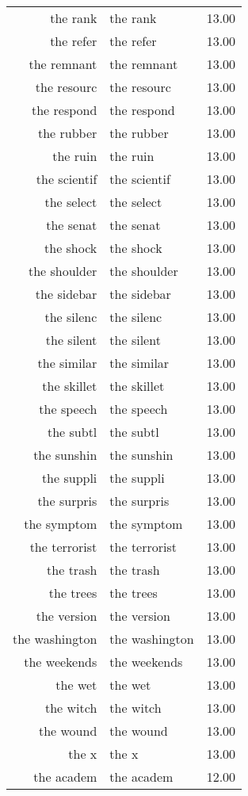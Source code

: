 \begin{table}[ht]
\begin{tabular}{rlr}
  the rank & the rank & 13.00 \\ 
  the refer & the refer & 13.00 \\ 
  the remnant & the remnant & 13.00 \\ 
  the resourc & the resourc & 13.00 \\ 
  the respond & the respond & 13.00 \\ 
  the rubber & the rubber & 13.00 \\ 
  the ruin & the ruin & 13.00 \\ 
  the scientif & the scientif & 13.00 \\ 
  the select & the select & 13.00 \\ 
  the senat & the senat & 13.00 \\ 
  the shock & the shock & 13.00 \\ 
  the shoulder & the shoulder & 13.00 \\ 
  the sidebar & the sidebar & 13.00 \\ 
  the silenc & the silenc & 13.00 \\ 
  the silent & the silent & 13.00 \\ 
  the similar & the similar & 13.00 \\ 
  the skillet & the skillet & 13.00 \\ 
  the speech & the speech & 13.00 \\ 
  the subtl & the subtl & 13.00 \\ 
  the sunshin & the sunshin & 13.00 \\ 
  the suppli & the suppli & 13.00 \\ 
  the surpris & the surpris & 13.00 \\ 
  the symptom & the symptom & 13.00 \\ 
  the terrorist & the terrorist & 13.00 \\ 
  the trash & the trash & 13.00 \\ 
  the trees & the trees & 13.00 \\ 
  the version & the version & 13.00 \\ 
  the washington & the washington & 13.00 \\ 
  the weekends & the weekends & 13.00 \\ 
  the wet & the wet & 13.00 \\ 
  the witch & the witch & 13.00 \\ 
  the wound & the wound & 13.00 \\ 
  the x & the x & 13.00 \\ 
  the academ & the academ & 12.00 \\ 

\end{tabular}
\end{table}
